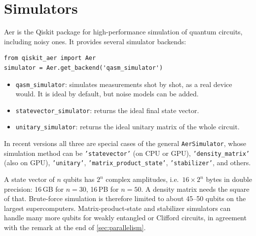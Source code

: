 \section{Simulators}
Aer is the Qiskit package for high-performance simulation of quantum circuits, including noisy ones. It provides several simulator backends:
\begin{lstlisting}
from qiskit_aer import Aer
simulator = Aer.get_backend('qasm_simulator')
\end{lstlisting}
\begin{itemize}
  \item \texttt{qasm\_simulator}: simulates measurements shot by shot, as a real device would. It is ideal by default, but noise models can be added.
  \item \texttt{statevector\_simulator}: returns the ideal final state vector.
  \item \texttt{unitary\_simulator}: returns the ideal unitary matrix of the whole circuit.
\end{itemize}
In recent versions all three are special cases of the general \texttt{AerSimulator}, whose simulation method can be \texttt{'statevector'} (on CPU or GPU), \texttt{'density\_matrix'} (also on
GPU), \texttt{'unitary'}, \texttt{'matrix\_product\_state'}, \texttt{'stabilizer'}, and others.

\begin{keypoint}
A state vector of $n$ qubits has $2^n$ complex amplitudes, i.e.\ $16\times2^n$ bytes in double precision: 16\,GB for $n=30$, 16\,PB for $n=50$. A density matrix needs the square of
that. Brute-force simulation is therefore limited to about 45--50 qubits on the largest supercomputers. Matrix-product-state and stabilizer simulators can handle many more qubits for weakly
entangled or Clifford circuits, in agreement with the remark at the end of \cref{sec:parallelism}.
\end{keypoint}

